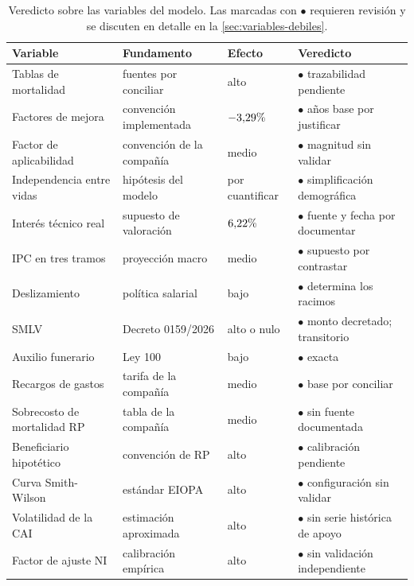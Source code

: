 \begin{table}[H]
\centering
\caption[Veredicto sobre las variables del modelo]{Veredicto sobre las variables
del modelo. Las marcadas con \textcolor{rojotesis}{$\bullet$} requieren revisión
y se discuten en detalle en la
\cref{sec:variables-debiles}.}
\label{tab:veredicto}
\small
\begin{tabular}{@{}>{\raggedright\arraybackslash}p{4.6cm}>{\raggedright\arraybackslash}p{3.4cm}>{\raggedright\arraybackslash}p{2.3cm}>{\raggedright\arraybackslash}p{4.0cm}@{}}
\toprule
\textbf{Variable} & \textbf{Fundamento} & \textbf{Efecto} & \textbf{Veredicto} \\
\midrule
Tablas de mortalidad & fuentes por conciliar & alto & \textcolor{naranja}{$\bullet$} trazabilidad pendiente \\
Factores de mejora & convención implementada & $-3{,}29\%$ & \textcolor{naranja}{$\bullet$} años base por justificar \\
Factor de aplicabilidad & convención de la compañía & medio & \textcolor{naranja}{$\bullet$} magnitud sin validar \\
Independencia entre vidas & hipótesis del modelo & por cuantificar & \textcolor{naranja}{$\bullet$} simplificación demográfica \\
Interés técnico real & supuesto de valoración & $6{,}22\%$ & \textcolor{naranja}{$\bullet$} fuente y fecha por documentar \\
IPC en tres tramos & proyección macro & medio & \textcolor{naranja}{$\bullet$} supuesto por contrastar \\
Deslizamiento & política salarial & bajo & \textcolor{verdetesis}{$\bullet$} determina los racimos \\
SMLV & Decreto 0159/2026 & alto o nulo & \textcolor{verdetesis}{$\bullet$} monto decretado; transitorio \\
Auxilio funerario & Ley 100 & bajo & \textcolor{verdetesis}{$\bullet$} exacta \\
Recargos de gastos & tarifa de la compañía & medio & \textcolor{naranja}{$\bullet$} base por conciliar \\
Sobrecosto de mortalidad RP & tabla de la compañía & medio & \textcolor{naranja}{$\bullet$} sin fuente documentada \\
Beneficiario hipotético & convención de RP & alto & \textcolor{naranja}{$\bullet$} calibración pendiente \\
Curva Smith-Wilson & estándar EIOPA & alto & \textcolor{rojotesis}{$\bullet$} configuración sin validar \\
Volatilidad de la CAI & estimación aproximada & alto & \textcolor{rojotesis}{$\bullet$} sin serie histórica de apoyo \\
Factor de ajuste NI & calibración empírica & alto & \textcolor{rojotesis}{$\bullet$} sin validación independiente \\
\bottomrule
\end{tabular}
\end{table}

